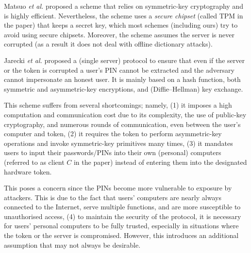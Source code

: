 Matsuo \textit{et al.} \cite{MatsuoMY11} proposed a scheme that relies on symmetric-key cryptography and is highly efficient. Nevertheless, the scheme uses a \emph{secure chipset} (called TPM in the paper) that keeps a secret key, which most schemes (including ours) try to avoid using secure chipsets. Moreover, the scheme assumes the server is never corrupted (as a result it does not deal with offline dictionary attacks). 




Jarecki \textit{et al.} \cite{JareckiJKSS21} proposed a (single server) protocol to ensure that even if the server or the token is corrupted a user's PIN cannot be extracted and the adversary cannot impersonate an honest user. It is mainly based on a hash function, both symmetric and asymmetric-key encryptions, and (Diffie–Hellman) key exchange. 

This scheme suffers from several shortcomings; namely, (1) it imposes a high computation and communication cost due to its complexity,  the use of public-key cryptography, and numerous rounds of communication, even between the user's computer and token, (2) it requires the token to perform asymmetric-key operations and invoke symmetric-key primitives many times, (3) it mandates users to input their passwords/PINs into their own (personal) computers (referred to as client $C$ in the paper) instead of entering them into the designated hardware token. 

This poses a concern since the PINs become more vulnerable to exposure by attackers. This is due to the fact that users' computers are nearly always connected to the Internet, serve multiple functions, and are more susceptible to unauthorised access, (4) to maintain the security of the protocol, it is necessary for users' personal computers to be fully trusted, especially in situations where the token or the server is compromised. However, this introduces an additional assumption that may not always be desirable.


%


